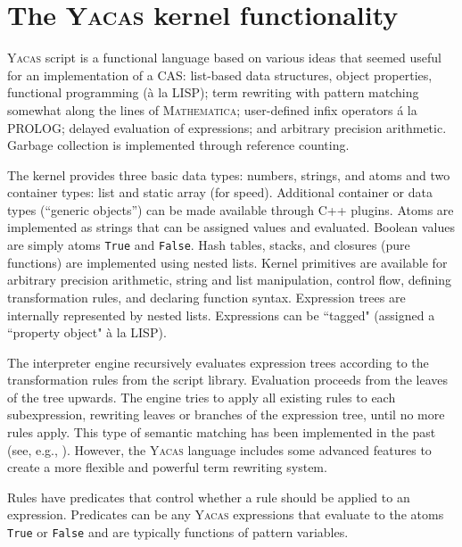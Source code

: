 \documentclass{llncs}
\begin{document}
%

\section{The \textsc{Yacas} kernel functionality}

\textsc{Yacas} script is a functional language based on various ideas that
seemed useful for an implementation of a CAS: list-based data structures,
object properties, functional programming (\`{a} la LISP); term rewriting
\cite{BN98} with pattern matching somewhat along the lines of
\textsc{Mathematica}; user-defined infix operators \'{a} la PROLOG; delayed
evaluation of expressions; and arbitrary precision arithmetic. Garbage
collection is implemented through reference counting.


The kernel provides three basic data types: numbers, strings, and atoms and
two container types: list and static array (for speed). Additional container or data types (``generic objects'') can be made available through C++ plugins. Atoms are implemented
as strings that can be assigned values and evaluated. Boolean values are simply
atoms \texttt{True} and \texttt{False}. Hash tables, stacks, and
closures (pure functions) are implemented using nested lists. Kernel primitives are available for arbitrary
precision arithmetic, string and list manipulation, control flow, defining
transformation rules, and declaring function  syntax. Expression trees are
internally represented by nested lists. Expressions can be ``tagged" (assigned a
``property object" \`{a} la LISP).

The interpreter engine recursively evaluates expression trees according to
the transformation rules from the script library.
Evaluation proceeds from the leaves of the tree upwards. The engine tries to apply all existing rules to each subexpression, rewriting leaves or branches of the expression tree, until no more rules apply.
%
This type of semantic matching has been implemented in the past
(see, e.g., \cite{C86}). However, the \textsc{Yacas} language
includes some advanced features to create a more flexible and powerful term
rewriting system.

Rules have predicates that control whether a
rule should be applied to an expression. Predicates can be any \textsc{Yacas}
expressions that evaluate to the atoms \texttt{True} or \texttt{False} and are typically
functions of pattern variables.
\end{document}
